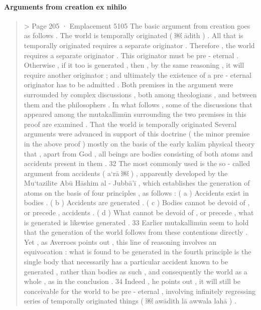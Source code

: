 \paragraph{Arguments from creation ex nihilo}
 \begin{quote} > Page 205 · Emplacement 5105
The basic argument from creation goes as follows . The world is temporally originated ( ￼ ādith ) . All that is temporally originated requires a separate originator . Therefore , the world requires a separate originator . This originator must be pre - eternal . Otherwise , if it too is generated , then , by the same reasoning , it will require another originator ; and ultimately the existence of a pre - eternal originator has to be admitted . Both premises in the argument were surrounded by complex discussions , both among theologians , and between them and the philosophers . In what follows , some of the discussions that appeared among the mutakallimūn surrounding the two premises in this proof are examined . That the world is temporally originated Several arguments were advanced in support of this doctrine ( the minor premise in the above proof ) mostly on the basis of the early kalām physical theory that , apart from God , all beings are bodies consisting of both atoms and accidents present
in them . 32 The most commonly used is the so - called argument from accidents ( a‘rā ￼ ) , apparently developed by the Mu‘tazilite Abū Hāshim al - Jubbā’ī , which establishes the generation of atoms on the basis of four principles , as follows : ( a ) Accidents exist in bodies . ( b ) Accidents are generated . ( c ) Bodies cannot be devoid of , or precede , accidents . ( d ) What cannot be devoid of , or precede , what is generated is likewise generated . 33 Earlier mutakallimūn seem to hold that the generation of the world follows from these contentions directly . Yet , as Averroes points out , this line of reasoning involves an equivocation : what is found to be generated in the fourth principle is the single body that necessarily has a particular accident known to be generated , rather than bodies as such , and consequently the world as a whole , as in the conclusion . 34 Indeed , he points out , it will still be conceivable for the world to be pre - eternal , involving infinitely regressing series of temporally originated things ( ￼ awādith lā awwala lahā ) .

\end{quote}
